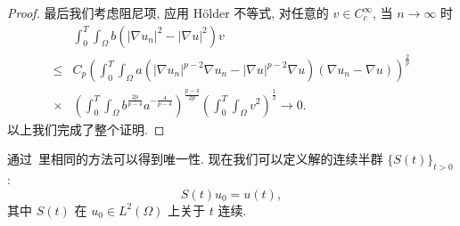 \documentclass[oneside,longtitle]{LZUthesis}
\theoremstyle{definition}
\numberwithin{equation}{chapter}
\newcommand*\abs[1]{\lvert#1\rvert}
\newcommand*\Brace[1]{\lbrace#1\rbrace}
\begin{document}
\begin{proof}
	最后我们考虑阻尼项, 应用 H\"older 不等式,
	对任意的 $v \in C_c^\infty$, 当 $n \to \infty$ 时
	\begin{equation}
		\begin{split}
			& \int_0^T\int_{\Omega}b\left(\abs{\nabla u_n}^2
			- \abs{\nabla u}^2\right)v\\
			\leq{} & C_p\left(\int_0^T\int_{\Omega}a
			\left(\abs{\nabla u_n}^{p-2}\nabla u_n
			- \abs{\nabla u}^{p-2}\nabla u\right)
			\left(\nabla u_n - \nabla u\right)\right)^{\frac{2}{p}}\\
			\times{} & \left(\int_0^T\int_{\Omega}b^{\frac{2p}{p-4}}a^{-\frac{4}{p-4}}\right)^{\frac{p-4}{2p}}
			\left(\int_0^T\int_{\Omega}v^2\right)^{\frac{1}{2}} \to 0.
		\end{split}
	\end{equation}
	以上我们完成了整个证明.
\end{proof}
通过~\cite{Zhan2019Uniquenessa}里相同的方法可以得到唯一性.
现在我们可以定义解的连续半群 $\Brace{S(t)}_{t>0}$:
\begin{equation}
	S(t)u_0 = u(t),
\end{equation}
其中 $S(t)$ 在 $u_{0} \in L^2(\Omega)$ 上关于 $t$ 连续.
\end{document}
